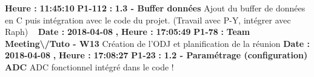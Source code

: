 \documentclass{article}%
\begin{document}
\textbf{ Heure : }%
\textbf{11:45:10}%
\newline%
%
\textbf{P1{-}112 }%
\textbf{ : }%
\textbf{ 1.3 {-} Buffer données}%
\newline%
\newline%
%
Ajout du buffer de données en C puis intégration avec le code du projet. (Travail avec P{-}Y, intégrer avec Raph)\newline%
~\newline%
\newline%
%
\textbf{Date : }%
\textbf{2018{-}04{-}08}%
\textbf{,}%
\textbf{ Heure : }%
\textbf{17:05:49}%
\newline%
%
\textbf{P1{-}78 }%
\textbf{ : }%
\textbf{ Team Meeting\textbackslash{}/Tuto {-} W13}%
\newline%
\newline%
%
Création de l'ODJ et planification de la réunion\newline%
\newline%
%
\textbf{Date : }%
\textbf{2018{-}04{-}08}%
\textbf{,}%
\textbf{ Heure : }%
\textbf{17:08:27}%
\newline%
%
\textbf{P1{-}23 }%
\textbf{ : }%
\textbf{ 1.2 {-} Paramétrage (configuration) ADC}%
\newline%
\newline%
%
ADC fonctionnel intégré dans le code !\newline%
\newline%
%
\newpage

%
\end{document}
